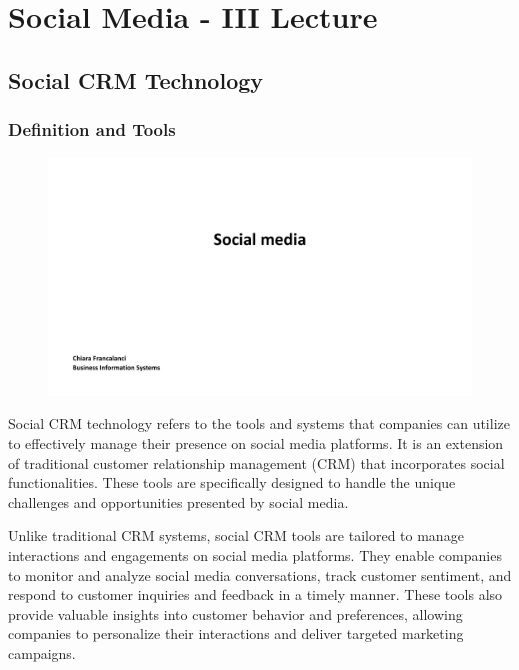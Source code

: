 \section{Social Media - III Lecture}

\subsection{Social CRM Technology}\label{social-crm-technology}

\subsubsection{Definition and Tools}\label{definition-and-tools}

\begin{figure}[!h]
  \centering
  \includegraphics[page=24, trim = 1.5cm 5cm 1.5cm 4cm, clip, width=\imagewidth]{images/04 - Social_Media.pdf}
\end{figure}

Social CRM technology refers to the tools and systems that companies can
utilize to effectively manage their presence on social media platforms.
It is an extension of traditional customer relationship management (CRM)
that incorporates social functionalities. These tools are specifically
designed to handle the unique challenges and opportunities presented by
social media.

Unlike traditional CRM systems, social CRM tools are tailored to manage
interactions and engagements on social media platforms. They enable
companies to monitor and analyze social media conversations, track
customer sentiment, and respond to customer inquiries and feedback in a
timely manner. These tools also provide valuable insights into customer
behavior and preferences, allowing companies to personalize their
interactions and deliver targeted marketing campaigns.

